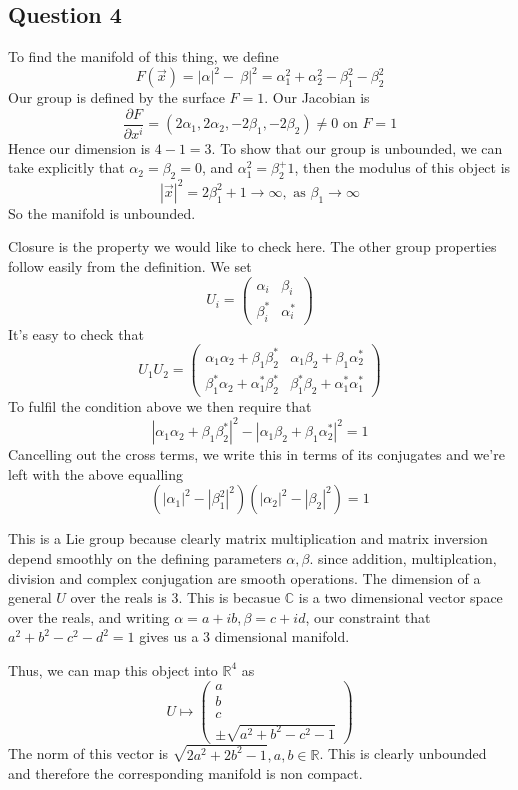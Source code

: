 \subsection{Question 4} 
To find the manifold of this thing, 
we define 
\[
	F ( \vec{x} ) = | \alpha | ^ 2 - \ \beta | ^ 2 = \alpha_ 1 ^ 2 + \alpha_ 2 ^ 2 - \beta _ 1^ 2  - \beta _ 2 ^ 2
\] Our group is defined by the surface $ F = 1 $. 
Our Jacobian is 
 \[
	 \frac{\partial F  }{\partial x^ i }  = ( 2 \alpha_ 1 , 2 \alpha_ 2 , - 2 \beta _ 1 , - 2\beta _ 2 ) \neq 0 \text{ on } F = 1
\] Hence our dimension is $ 4 -1  = 3$. To show that 
our group is unbounded, we can take explicitly 
that $ \alpha _ 2 = \beta _ 2 = 0 $, and  $ \alpha_ 1 ^ 2 = \beta _ 2^ + 1 $, then 
the modulus of this object is 
 \[
 | \vec{x} | ^ 2 = 2 \beta_ 1 ^  2 + 1 \to \infty, \text{ as } \beta _ 1 \to \infty
\] So the manifold is unbounded.


Closure is the property we would like to check here. The other group properties follow easily from the definition.
We set \[
U_i = \begin{pmatrix}
\alpha_i & \beta_i \\
\beta_i^* & \alpha_i^*
\end{pmatrix} 
\] 
It's easy to check that 
\[ 
U_1 U_2 = \begin{pmatrix} 
\alpha_1\alpha_2 + \beta_1 \beta_2^* & \alpha_1\beta_2  +\beta_1\alpha_2^* \\
\beta_1^*\alpha_2 + \alpha_1^* \beta_2^* & \beta_1^* \beta_2 + \alpha_1^*\alpha_1^* 
\end{pmatrix}
\]
To fulfil the condition above we then require that 
\[
|\alpha_1\alpha_2 + \beta_1\beta_2^*|^2 - |\alpha_1 \beta_2 + \beta_1 \alpha_2^*|^2 = 1
\] 
Cancelling out the cross terms, we write this in terms of its conjugates and we're left with the above equalling 
\[ 
\left( |\alpha_1|^2 - |\beta_1^2|^2 \right)\left( |\alpha_2|^2 - |\beta_2|^2 \right) = 1
\] 

This is a Lie group because clearly matrix multiplication and matrix inversion depend smoothly on the defining parameters $\alpha, \beta$. since addition, multiplcation, division and complex conjugation are smooth operations.
The dimension of a general $U$ over the reals is 3. This is becasue $\mathbb{C}$ is a two dimensional vector space over the reals, and writing $\alpha = a + ib, \beta = c + id$, our constraint that $a^2 + b^2 - c^2 - d^2 = 1$ gives us a 3 dimensional manifold.

Thus, we can map this object into $\mathbb{R}^4$ as 
\[ 
U \mapsto \begin{pmatrix}
a \\ b \\ c \\ \pm \sqrt{a^2 + b^2 - c^2 - 1} \end{pmatrix}
\] 
The norm of this vector is $\sqrt{2 a^2 + 2b^2 - 1}, a, b \in \mathbb{R}$. This is clearly unbounded and therefore the corresponding manifold is non compact.   



\pagebreak
